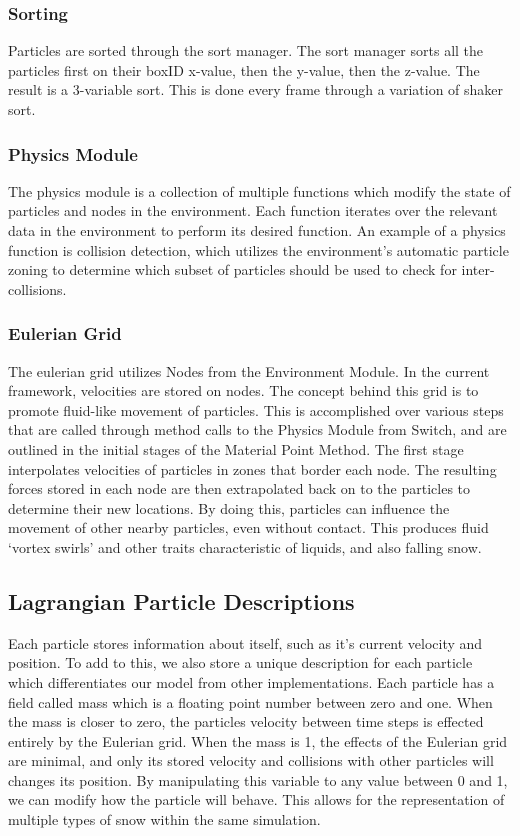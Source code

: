 \documentclass{acm_proc_article-sp}
\begin{document}
\subsubsection{Sorting}
Particles are sorted through the sort manager. The sort manager sorts all the particles first on their boxID x-value, then the y-value, then the z-value. The result is a 3-variable sort. This is done every frame through a variation of shaker sort.

\subsubsection{Physics Module}
The physics module is a collection of multiple functions which modify the state of particles and nodes in the environment. Each function iterates over the relevant data in the environment to perform its desired function. An example of a physics function is collision detection, which utilizes the environment’s automatic particle zoning to determine which subset of particles should be used to check for inter-collisions.

\subsubsection{Eulerian Grid}
The eulerian grid utilizes Nodes from the Environment Module. In the current framework, velocities are stored on nodes. The concept behind this grid is to promote fluid-like movement of particles. This is accomplished over various steps that are called through method calls to the Physics Module from Switch, and are outlined in the initial stages of the Material Point Method. The first stage interpolates velocities of particles in zones that border each node. The resulting forces stored in each node are then extrapolated back on to the particles to determine their new locations. By doing this, particles can influence the movement of other nearby particles, even without contact. This produces fluid ‘vortex swirls’ and other traits characteristic of liquids, and also falling snow.

\subsection{Lagrangian Particle Descriptions}
Each particle stores information about itself, such as it’s current velocity and position. To add to this, we also store a unique description for each particle which differentiates our model from other implementations. Each particle has a field called mass which is a floating point number between zero and one. When the mass is closer to zero, the particles velocity between time steps is effected entirely by the Eulerian grid. When the mass is 1, the effects of the Eulerian grid are minimal, and only its stored velocity and collisions with other particles will changes its position. By manipulating this variable to any value between 0 and 1, we can modify how the particle will behave. This allows for the representation of multiple types of snow within the same simulation.
\end{document}
